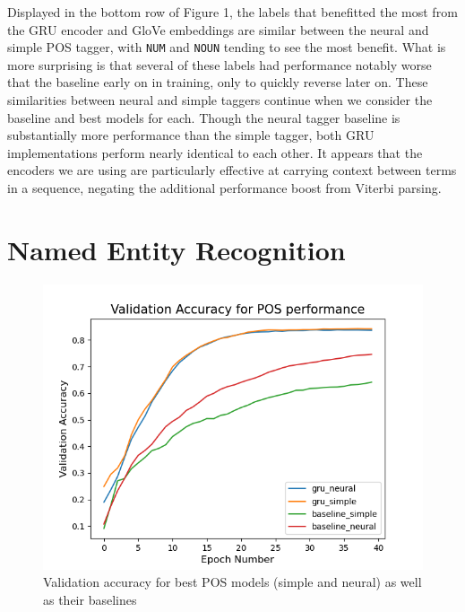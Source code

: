 \documentclass[11pt,a4paper]{article}
\begin{document}

Displayed in the bottom row of Figure 1, the labels that benefitted the most from the GRU encoder and GloVe embeddings are similar between the neural and simple POS tagger, with \texttt{NUM} and \texttt{NOUN} tending to see the most benefit. What is more surprising is that several of these labels had performance notably worse that the baseline early on in training, only to quickly reverse later on. These similarities between neural and simple taggers continue when we consider the baseline and best models for each. Though the neural tagger baseline is substantially more performance than the simple tagger, both GRU implementations perform nearly identical to each other. It appears that the encoders we are using are particularly effective at carrying context between terms in a sequence, negating the additional performance boost from Viterbi parsing.

\section{Named Entity Recognition}%
\label{sec:named_entity_recognition}

\FloatBarrier
\begin{figure}[h]
  \centering
  \includegraphics[width=0.97\linewidth]{imgs/best_POS.png}
  \caption{Validation accuracy for best POS models (simple and neural) as well as their
  baselines}%
  \label{fig:best_pos}
  \vspace{-13pt}
\end{figure}
\FloatBarrier
\end{document}

